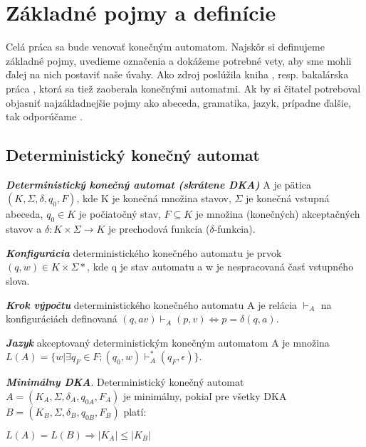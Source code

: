\chapter{Základné pojmy a definície}

Celá práca sa bude venovať konečným automatom. Najskôr si definujeme základné pojmy, uvedieme označenia a dokážeme potrebné vety, aby sme mohli ďalej na nich postaviť naše úvahy. Ako zdroj poslúžila kniha \cite{hopcroft}, resp. bakalárska práca \cite{petruchova}, ktorá sa tiež zaoberala konečnými automatmi. Ak by si čitateľ potreboval objasniť najzákladnejšie pojmy ako abeceda, gramatika, jazyk, prípadne ďalšie, tak odporúčame \cite{skripta}. 

\section{Deterministický konečný automat}

\begin{defn}{\textbf {\textit {Deterministický konečný automat (skrátene DKA)}}} A je pätica $(K,\Sigma,\delta,q_0,F)$, kde K je konečná množina stavov, $\Sigma$ je konečná vstupná abeceda, $q_0 \in K$ je počiatočný stav, $F \subseteq K$ je množina (konečných) akceptačných stavov a $\delta: K \times \Sigma \rightarrow K$ je prechodová funkcia ($\delta$-funkcia).  
\end{defn}

\begin{defn}{\textbf {\textit {Konfigurácia}}} deterministického konečného automatu je prvok $(q,w) \in K \times \Sigma*$, kde q je stav automatu a w je nespracovaná časť vstupného slova.\end{defn}

\begin{defn}{\textbf {\textit {Krok výpočtu}}} deterministického konečného automatu A je relácia $\vdash_A$ na konfiguráciách definovaná $(q,av)\vdash_A(p,v) \Longleftrightarrow p=\delta(q,a)$.\end{defn}

\begin{defn}{\textbf {\textit {Jazyk}}} akceptovaný deterministickým konečným automatom A je množina $L(A) = \{w | \exists q_F \in F; (q_0,w) \vdash^*_A(q_F,\epsilon)\}$.\end{defn}

\begin{defn}{\textbf {\textit {Minimálny DKA}}}. Deterministický konečný automat
\\ 
$A=(K_A,\Sigma,\delta_A,q_{0A},F_A)$ je minimálny, pokiaľ pre všetky DKA $B = (K_B,\Sigma,\delta_B,q_{0B},F_B)$ platí:
\\
\centerline{$L(A) = L(B) \Rightarrow |K_A| \leq |K_B|$}
\end{defn}

